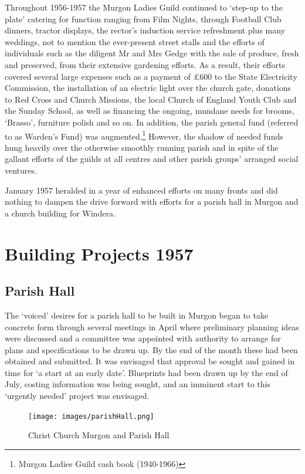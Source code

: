 Throughout 1956-1957 the Murgon Ladies Guild continued to `step-up to
the plate' catering for function ranging from Film Nights, through
Football Club dinners, tractor displays, the rector's induction service
refreshment plus many weddings, not to mention the ever-present street
stalls and the efforts of individuals such as the diligent Mr and Mrs
Gedge with the sale of produce, fresh and preserved, from their
extensive gardening efforts. As a result, their efforts covered several
large expenses such as a payment of \pounds600 to the State Electricity
Commission, the installation of an electric light over the church gate,
donations to Red Cross and Church Missions, the local Church of England
Youth Club and the Sunday School, as well as financing the ongoing,
mundane needs for brooms, `Brasso', furniture polish and so on. In
addition, the parish general fund (referred to as Warden's Fund) was
augmented.\footnote{Murgon Ladies Guild cash book (1940-1966)} However,
the shadow of needed funds hung heavily over the otherwise smoothly
running parish and in spite of the gallant efforts of the guilds at all
centres and other parish groups' arranged social ventures.

January 1957 heralded in a year of enhanced efforts on many fronts and
did nothing to dampen the drive forward with efforts for a parish hall
in Murgon and a church building for Windera.

\section{Building Projects 1957}

\subsection{Parish Hall}

The `voiced' desires for a parish hall to be built in Murgon began to
take concrete form through several meetings in April where preliminary
planning ideas were discussed and a committee was appointed with
authority to arrange for plans and specifications to be drawn up. By the
end of the month these had been obtained and submitted. It was envisaged
that approval be sought and gained in time for `a start at an early
date'. Blueprints had been drawn up by the end of July, costing
information was being sought, and an imminent start to this `urgently
needed' project was envisaged.




\begin{figure}[!h]
\begin{center}
\texttt{[image: images/parishHall.png]}
\caption{Christ Church Murgon and Parish Hall}
\end{center}
\end{figure}


